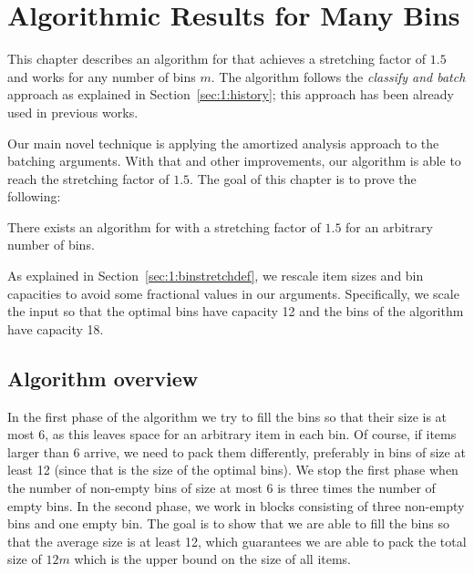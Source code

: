 \chapter{Algorithmic Results for Many Bins}\label{chap:manybins}


This chapter describes an algorithm for \binstretch that achieves a
stretching factor of $1.5$ and works for any number of bins $m$. The
algorithm follows the \emph{classify and batch} approach as explained
in Section~\ref{sec:1:history}; this approach has been already used in
previous works.

Our main novel technique is applying the amortized analysis approach
to the batching arguments. With that and other improvements, our
algorithm is able to reach the stretching factor of $1.5$. The
goal of this chapter is to prove the following:

\begin{thm}\label{thm:onepointfive}
There exists an algorithm for \binstretch with a stretching factor of
$1.5$ for an arbitrary number of bins.
\end{thm}

As explained in Section~\ref{sec:1:binstretchdef}, we rescale item
sizes and bin capacities to avoid some fractional values in our
arguments. Specifically, we scale the input so that the optimal bins
have capacity 12 and the bins of the algorithm have capacity 18.


\section{Algorithm overview}\label{chap:2:overview}

In the first phase of the algorithm we try to fill the bins so that
their size is at most 6, as this leaves space for an arbitrary item in
each bin. Of course, if items larger than 6 arrive, we need to pack
them differently, preferably in bins of size at least 12 (since that
is the size of the optimal bins). We stop the first phase when the
number of non-empty bins of size at most 6 is three times the number
of empty bins. In the second phase, we work in blocks consisting of
three non-empty bins and one empty bin. The goal is to show that we
are able to fill the bins so that the average size is at least 12,
which guarantees we are able to pack the total size of $12m$ which is
the upper bound on the size of all items.

